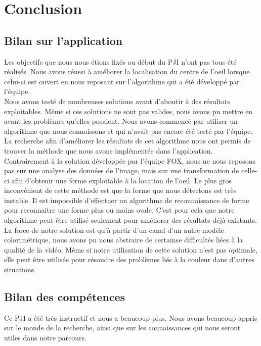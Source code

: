 \section{Conclusion}

\subsection{Bilan sur l'application}
Les objectifs que nous nous étions fixés au début du PJI n'ont pas tous été réalisés. Nous avons réussi à
améliorer la localisation du centre de l'oeil lorsque celui-ci est ouvert en nous reposant sur 
l'algorithme qui a été développé par l'équipe.\\

Nous avons testé de nombreuses solutions avant d'aboutir à des résultats exploitables. Même si 
ces solutions ne sont pas valides, nous avons pu mettre en avant les problèmes qu'elles posaient.
Nous avons commencé par utiliser un algorithme que nous connaissons et qui n'avait pas encore 
été testé par l'équipe. La recherche afin d'améliorer les résultats de cet algorithme nous 
ont permis de trouver la méthode que nous avons implémentée dans l'application.\\

Contrairement à la solution développée par l'équipe FOX, nous ne nous reposons pas sur une analyse des 
données de l'image, mais sur une transformation de celle-ci afin d'obtenir une forme exploitable
à la location de l'oeil. Le plus gros inconvénient de cette méthode est que la forme que nous détectons
est très instable. Il est impossible d'effectuer un algorithme de reconnaissance de forme pour 
reconnaitre une forme plus ou moins ovale. C'est pour cela que notre algorithme peut-être utilisé
seulement pour améliorer des résultats déjà existants.\\

La force de notre solution est qu'à partir d'un canal d'un autre modèle colorimétrique, nous avons pu 
nous abstraire de certainse difficultés liées à la qualité de la vidéo. Même si notre utilisation de cette
solution n'est pas optimale, elle peut être utilisée pour résoudre des problèmes liés à la couleur dans d'autres situations.\\

\subsection{Bilan des compétences}
Ce PJI a été très instructif et nous a beaucoup plus. Nous avons beaucoup appris sur le monde 
de la recherche, ainsi que sur les connaissances qui nous seront utiles dans notre parcours.\\

